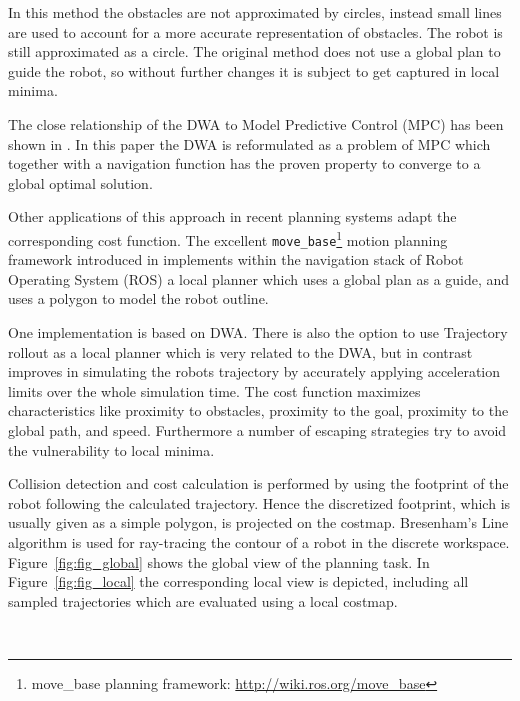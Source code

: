 In this method the obstacles are not approximated by circles, instead small lines are used to account for a more accurate representation of obstacles.
The robot is still approximated as a circle.
The original method does not use a global plan to guide the robot, so without further changes it is subject to get captured in local minima.

The close relationship of the DWA to Model Predictive Control (MPC) has been shown in \cite{ogren2005convergent}. 
In this paper the DWA is reformulated as a problem of MPC which together with a navigation function has the proven property to converge to a global optimal solution.

Other applications of this approach in recent planning systems adapt the corresponding cost function.
The excellent \texttt{move\_base}\footnote{move\_base planning framework: \url{http://wiki.ros.org/move_base}} motion planning framework introduced in \cite{DBLP:conf/icra/Marder-EppsteinBFGK10} implements within the navigation stack of Robot Operating System (ROS) a local planner which uses a global plan as a guide, and uses a polygon to model the robot outline.

One implementation is based on DWA.
There is also the option to use Trajectory rollout \cite{gerkey08planning} as a local planner which is very related to the DWA, but in contrast improves in simulating the robots trajectory by accurately applying acceleration limits over the whole simulation time.
The cost function maximizes characteristics like proximity to obstacles, proximity to the goal, proximity to the global path, and speed.
Furthermore a number of escaping strategies try to avoid the vulnerability to local minima. 

Collision detection and cost calculation is performed by using the footprint of the robot following the calculated trajectory.
Hence the discretized footprint, which is usually given as a simple polygon, is projected on the costmap. 
Bresenham's Line algorithm \cite{bresenham1965algorithm} is used for ray-tracing the contour of a robot in the discrete workspace. 
Figure~\ref{fig:fig_global} shows the global view of the planning task. 
In Figure~\ref{fig:fig_local} the corresponding local view is depicted, including all sampled trajectories which are evaluated using a local costmap.

\begin{figure}[thpb]
	  \myfloatalign
      \footnotesize
      \centering
     \\    
   \caption[]{}
   \label{fig:fig_dwa}
\end{figure}

